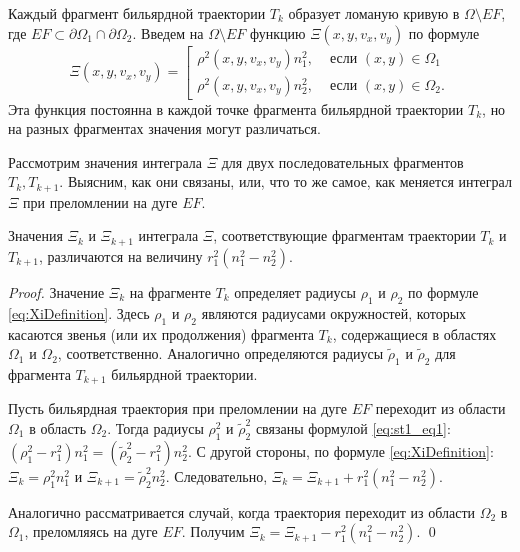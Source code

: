 
Каждый фрагмент бильярдной траектории $T_k$ образует ломаную кривую в $\Omega \setminus EF$, где $EF  \subset \partial \Omega_1 \cap \partial \Omega_2$.
Введем на $\Omega \setminus EF$ функцию $\Xi(x, y, v_x, v_y)$ по формуле
\begin{equation}
\Xi(x, y, v_x, v_y) = \left[
\begin{array}{ll}
    \rho^2(x,y,v_x,v_y) n_1^2, &  \text{ если } (x,y) \in \Omega_1 \\
    \rho^2(x,y,v_x,v_y) n_2^2, & \text{ если } (x,y) \in \Omega_2.
\end{array}
\right.
\label{eq:XiDefinition}
\end{equation}
Эта функция постоянна в каждой точке фрагмента бильярдной траектории $T_k$, но на разных фрагментах значения могут различаться. 

Рассмотрим значения интеграла $\Xi$ для двух последовательных фрагментов $T_k, T_{k+1}$. Выясним, как они связаны, или, что то же самое, как меняется интеграл $\Xi$ при преломлении на дуге $EF$. 

\begin{statement}
Значения $\Xi_k$ и $\Xi_{k+1}$  интеграла $\Xi$, соответствующие фрагментам траектории $T_k$ и $T_{k+1}$, различаются на величину $r_1^2(n_1^2-n_2^2)$.
\end{statement}
\begin{proof}
Значение $\Xi_k$ на фрагменте $T_k$ определяет радиусы $\rho_1$ и $\rho_2$ по формуле \eqref{eq:XiDefinition}. Здесь $\rho_1$ и $\rho_2$ являются радиусами окружностей, которых касаются звенья (или их продолжения) фрагмента $T_k$, содержащиеся в областях $\Omega_1$ и $\Omega_2$, соответственно.
Аналогично определяются радиусы $\widetilde{\rho}_1$ и $\widetilde{\rho}_2$ для фрагмента $T_{k+1}$ бильярдной траектории.


Пусть бильярдная траектория при преломлении на дуге $EF$ переходит из области $\Omega_1$ в область $\Omega_2$. 
Тогда радиусы $\rho_1^2$ и $\widetilde{\rho}_2^2$ связаны формулой \eqref{eq:st1_eq1}:  $(\rho_1^2 - r_1^2)n_1^2 = (\widetilde{\rho}_2^2 - r_1^2)n_2^2$.
С другой стороны, по формуле \eqref{eq:XiDefinition}: $\Xi_k = \rho_1^2 n_1^2$ и $\Xi_{k+1} = \widetilde{\rho}_2^2 n_2^2$.
Следовательно, $\Xi_k = \Xi_{k+1}  +r_1^2 (n_1^2 - n_2^2 )$.

Аналогично рассматривается случай, когда траектория переходит из области $\Omega_2$ в $\Omega_1$, преломляясь на дуге $EF$. Получим $\Xi_k = \Xi_{k+1}  - r_1^2 (n_1^2 - n_2^2 )$.
\qed
\end{proof}



